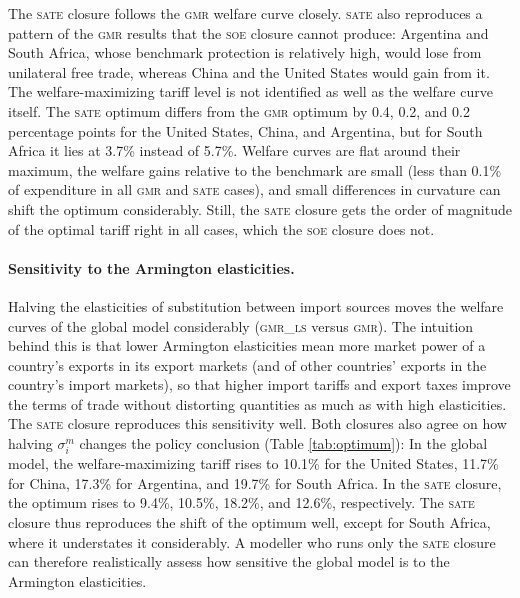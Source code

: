 \documentclass{jgea}
\newcommand{\SOE}{\textsc{soe}\xspace}
\newcommand{\SATE}{\textsc{sate}\xspace}
\newcommand{\GMR}{\textsc{gmr}\xspace}
\newcommand{\GMRLS}{\textsc{gmr\_ls}\xspace}
\newcommand{\SATELS}{\textsc{sate\_ls}\xspace}
\begin{document}
The \SATE closure follows the \GMR welfare curve closely.
\SATE also reproduces a pattern of the \GMR results that the \SOE closure cannot produce:
Argentina and South Africa, whose benchmark protection is relatively high, would lose from unilateral free trade, whereas China and the United States would gain from it.
The welfare-maximizing tariff level is not identified as well as the welfare curve itself.
The \SATE optimum differs from the \GMR optimum by 0.4, 0.2, and 0.2 percentage points for the United States, China, and Argentina, but for South Africa it lies at 3.7\% instead of 5.7\%.
Welfare curves are flat around their maximum, the welfare gains relative to the benchmark are small (less than 0.1\% of expenditure in all \GMR and \SATE cases), and small differences in curvature can shift the optimum considerably.
Still, the \SATE closure gets the order of magnitude of the optimal tariff right in all cases, which the \SOE closure does not.

\paragraph{\bf Sensitivity to the Armington elasticities.}
Halving the elasticities of substitution between import sources moves the welfare curves of the global model considerably (\GMRLS versus \GMR).
The intuition behind this is that lower Armington elasticities mean more market power of a country's exports in its export markets (and of other countries' exports in the country's import markets), so that higher import tariffs and export taxes improve the terms of trade without distorting quantities as much as with high elasticities.
The \SATE closure reproduces this sensitivity well.
Both closures also agree on how halving $\sigma^m_i$ changes the policy conclusion (Table \ref{tab:optimum}):
In the global model, the welfare-maximizing tariff rises to 10.1\% for the United States, 11.7\% for China, 17.3\% for Argentina, and 19.7\% for South Africa.
In the \SATE closure, the optimum rises to 9.4\%, 10.5\%, 18.2\%, and 12.6\%, respectively.
The \SATE closure thus reproduces the shift of the optimum well, except for South Africa, where it understates it considerably.
A modeller who runs only the \SATE closure can therefore realistically assess how sensitive the global model is to the Armington elasticities.
\end{document}

